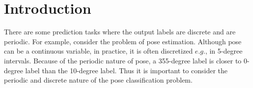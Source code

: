 \section{Introduction}






There are some prediction tasks where the output labels are discrete and are periodic. For example, consider the problem of pose estimation. Although pose can be a continuous variable, in practice, it is often discretized $e.g.$, in 5-degree intervals. Because of the periodic nature of pose, a 355-degree label is closer to 0-degree label than the 10-degree label. Thus it is important to consider the periodic and discrete nature of the pose classification problem.



